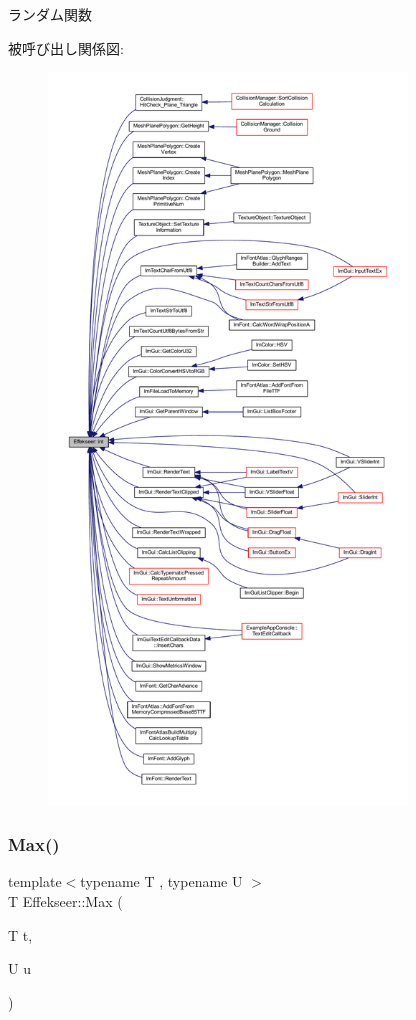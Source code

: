 ランダム関数 

被呼び出し関係図\+:\nopagebreak
\begin{figure}[H]
\begin{center}
\leavevmode
\includegraphics[height=550pt]{namespace_effekseer_ace0abf7c2e6947e519ebe8b54cbcc30a_icgraph}
\end{center}
\end{figure}
\mbox{\label{namespace_effekseer_afc3d4e56cf4f8d0f12ac7d4bee7591b9}} 
\subsubsection{\texorpdfstring{Max()}{Max()}}
{\footnotesize\ttfamily template$<$typename T , typename U $>$ \\
T Effekseer\+::\+Max (\begin{DoxyParamCaption}\item[{T}]{t,  }\item[{U}]{u }\end{DoxyParamCaption})}



